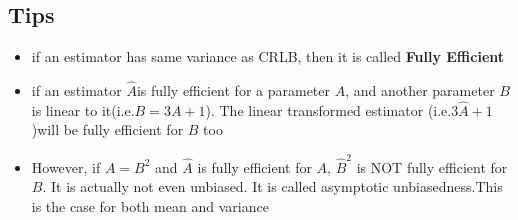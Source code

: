 \documentclass{article}
\begin{document}
\subsection{Tips}
\begin{itemize}
    \item if an estimator has same variance as CRLB, then it is called \textbf{Fully Efficient}
    \item if an estimator $\hat{A}$is fully efficient for a parameter $A$, and another parameter $B$ is linear to it(i.e.$B=3A+1$). The linear transformed estimator (i.e.$3\hat{A}+1$)will be fully efficient for $B$ too
    \item However, if $A=B^2$ and $\hat{A}$ is fully efficient for $A$, $\hat{B}^2$ is NOT fully efficient for $B$. It is actually not even unbiased. It is called asymptotic unbiasedness.This is the case for both mean and variance
\end{itemize}
\end{document}
